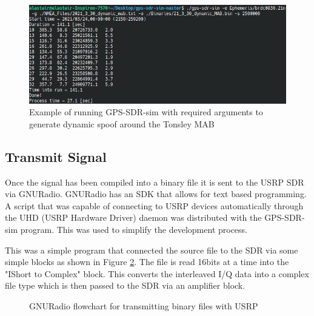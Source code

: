 \begin{figure}[!ht]
    \begin{centering}
        \includegraphics[width=14cm,keepaspectratio]{Figures/gps-sdr-sim running.png}
        \caption{Example of running GPS-SDR-sim with required arguments to generate dynamic spoof around the Tonsley MAB}
    \label{fig:sdrsimexample}
    \end{centering}
\end{figure}

\subsection{Transmit Signal}
Once the signal has been compiled into a binary file it is sent to the USRP SDR via GNURadio. GNURadio has an SDK that allows for text based programming. A script that was
capable of connecting to USRP devices automatically through the UHD (USRP Hardware Driver) daemon was distributed with the GPS-SDR-sim program. This was used to simplify the development
process. 

This was a simple program that connected the source file to the SDR via some simple blocks as shown in Figure \ref{fig:GNURadioSpoof}. The file is read 16bits at a time
into the "IShort to Complex" block. This converts the interleaved I/Q data into a complex file type which is then passed to the SDR via an amplifier block.

\begin{figure}[!ht]
    \begin{centering}
        \caption{GNURadio flowchart for transmitting binary files with USRP}
    \label{fig:GNURadioSpoof}
    \end{centering}
\end{figure}

